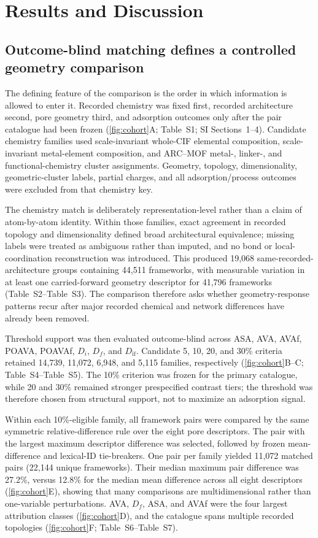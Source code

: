 \documentclass[11pt,a4paper]{article}
\newcommand{\SItab}[1]{Table~S#1}
\newcommand{\SIsecs}[1]{SI Sections~#1}
\begin{document}
\section{Results and Discussion}

\subsection{Outcome-blind matching defines a controlled geometry comparison}

The defining feature of the comparison is the order in which information is allowed
to enter it. Recorded chemistry was fixed first, recorded architecture second, pore
geometry third, and adsorption outcomes only after the pair catalogue had been
frozen (\cref{fig:cohort}A; \SItab{1}; \SIsecs{1--4}). Candidate chemistry
families used scale-invariant whole-CIF elemental composition, scale-invariant
metal-element composition, and ARC--MOF metal-, linker-, and functional-chemistry
cluster assignments. Geometry, topology, dimensionality, geometric-cluster labels,
partial charges, and all adsorption/process outcomes were excluded from that
chemistry key.

The chemistry match is deliberately representation-level rather than a claim of
atom-by-atom identity. Within those families, exact agreement in recorded topology
and dimensionality defined broad architectural equivalence; missing labels were
treated as ambiguous rather than imputed, and no bond or local-coordination
reconstruction was introduced. This produced 19,068 same-recorded-architecture
groups containing 44,511 frameworks, with measurable variation in at least one
carried-forward geometry descriptor for 41,796 frameworks
(\SItab{2}--\SItab{3}). The comparison therefore asks whether geometry-response
patterns recur after major recorded chemical and network differences have already
been removed.

Threshold support was then evaluated outcome-blind across ASA, AVA, AVAf, POAVA,
POAVAf, $D_i$, $D_f$, and $D_{\mathrm{if}}$. Candidate 5, 10, 20, and 30\%
criteria retained 14,739, 11,072, 6,948, and 5,115 families, respectively
(\cref{fig:cohort}B--C; \SItab{4}--\SItab{5}). The 10\% criterion was frozen for
the primary catalogue, while 20 and 30\% remained stronger prespecified contrast
tiers; the threshold was therefore chosen from structural support, not to maximize
an adsorption signal.

Within each 10\%-eligible family, all framework pairs were compared by the same
symmetric relative-difference rule over the eight pore descriptors. The pair with
the largest maximum descriptor difference was selected, followed by frozen
mean-difference and lexical-ID tie-breakers. One pair per family yielded 11,072
matched pairs (22,144 unique frameworks). Their median maximum pair difference was
27.2\%, versus 12.8\% for the median mean difference across all eight descriptors
(\cref{fig:cohort}E), showing that many comparisons are multidimensional rather
than one-variable perturbations. AVA, $D_f$, ASA, and AVAf were the four largest
attribution classes (\cref{fig:cohort}D), and the catalogue spans multiple recorded
topologies (\cref{fig:cohort}F; \SItab{6}--\SItab{7}).
\end{document}
